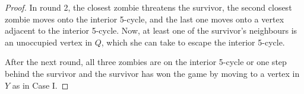 \begin{proof}
In round 2, the closest zombie threatens the survivor, the second closest zombie moves onto the interior 5-cycle, and the last one moves onto a vertex adjacent to the
interior 5-cycle. Now, at least one of the survivor's neighbours is an unoccupied vertex in $Q$, which she can take to escape the interior 5-cycle.

After the next round, all three zombies are on the interior 5-cycle or one step behind the survivor and the survivor has won the game by moving to a vertex in $Y$
as in Case I.

\end{proof}
